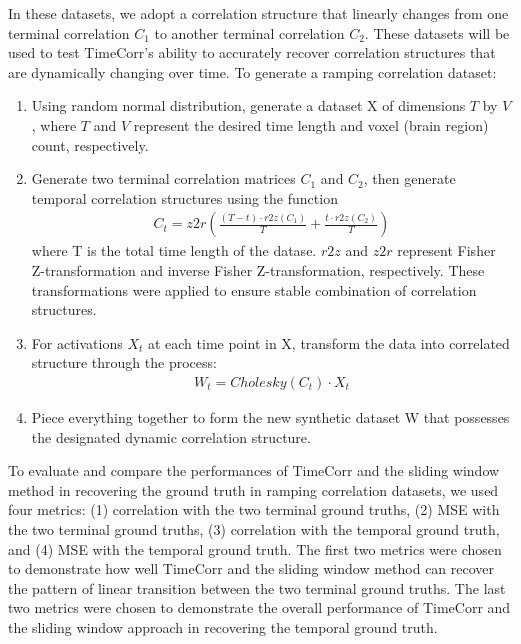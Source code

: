 \documentclass[11pt]{article}
\begin{document}
In these datasets, we adopt a correlation structure that linearly changes from one terminal correlation $C_1$ to another terminal correlation $C_2$. These datasets will be used to test TimeCorr's ability to accurately recover correlation structures that are dynamically changing over time. To generate a ramping correlation dataset:
\begin{enumerate}
\item Using random normal distribution, generate a dataset X of dimensions $T$ by $V$, where $T$ and $V$ represent the desired time length and voxel (brain region) count, respectively.
\item Generate two terminal correlation matrices $C_1$ and $C_2$, then generate temporal correlation structures using the function
\begin{align*}
C_t = z2r(\frac{(T-t) \cdot r2z(C_1)}{T} + \frac{t\cdot r2z(C_2)}{T})
\end{align*}
where T is the total time length of the datase. $r2z$ and $z2r$ represent Fisher Z-transformation and inverse Fisher Z-transformation, respectively. These transformations were applied to ensure stable combination of correlation structures.
\item For activations $X_t$ at each time point in X, transform the data into correlated structure through the process:
\begin{align*}
W_t = Cholesky(C_t) \cdot X_t
\end{align*}
\item Piece everything together to form the new synthetic dataset W that possesses the designated dynamic correlation structure.
\end{enumerate}

To evaluate and compare the performances of TimeCorr and the sliding window method in recovering the ground truth in ramping correlation datasets, we used four metrics: (1) correlation with the two terminal ground truths, (2) MSE with the two terminal ground truths, (3) correlation with the temporal ground truth, and (4) MSE with the temporal ground truth. The first two metrics were chosen to demonstrate how well TimeCorr and the sliding window method can recover the pattern of linear transition between the two terminal ground truths. The last two metrics were chosen to demonstrate the overall performance of TimeCorr and the sliding window approach in recovering the temporal ground truth.
\end{document}
